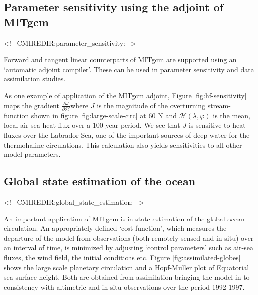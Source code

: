

\subsection{Parameter sensitivity using the adjoint of MITgcm}
\begin{rawhtml}
<!-- CMIREDIR:parameter_sensitivity: -->
\end{rawhtml}

Forward and tangent linear counterparts of MITgcm are supported using an
`automatic adjoint compiler'. These can be used in parameter sensitivity and
data assimilation studies.

As one example of application of the MITgcm adjoint, Figure \ref{fig:hf-sensitivity}
maps the gradient $\frac{\partial J}{\partial \mathcal{H}}$where $J$ is the magnitude
of the overturning stream-function shown in figure \ref{fig:large-scale-circ}
at 60$^{\circ }$N and $
\mathcal{H}(\lambda,\varphi)$ is the mean, local air-sea heat flux over
a 100 year period. We see that $J$ is
sensitive to heat fluxes over the Labrador Sea, one of the important sources
of deep water for the thermohaline circulations. This calculation also
yields sensitivities to all other model parameters.



\subsection{Global state estimation of the ocean}
\begin{rawhtml}
<!-- CMIREDIR:global_state_estimation: -->
\end{rawhtml}


An important application of MITgcm is in state estimation of the global
ocean circulation. An appropriately defined `cost function', which measures
the departure of the model from observations (both remotely sensed and
in-situ) over an interval of time, is minimized by adjusting `control
parameters' such as air-sea fluxes, the wind field, the initial conditions
etc. Figure \ref{fig:assimilated-globes} shows the large scale planetary
circulation and a Hopf-Muller plot of Equatorial sea-surface height.
Both are obtained from assimilation bringing the model in to
consistency with altimetric and in-situ observations over the period
1992-1997.




